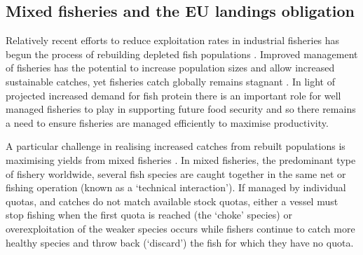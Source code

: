 \documentclass{nature}
\begin{document}
\begin{linenumbers}
\begin{abstract}
[296 words]

\end{abstract}

\section*{}

\subsection{Mixed fisheries and the EU landings obligation} 

Relatively recent efforts to reduce exploitation rates in industrial fisheries has begun the process of 
rebuilding depleted fish populations \cite{Worm2009}.
Improved management of fisheries has the potential to increase population sizes
and allow increased sustainable catches, yet fisheries catch globally remains stagnant
\cite{FAO2016}. In light of projected increased demand for fish protein
\cite{B??n??2016} there is an important role for well managed fisheries to play
in supporting future food security \cite{Mcclanahan2015} and so there remains a
need to ensure fisheries are managed efficiently to maximise productivity.

A particular challenge in realising increased catches from rebuilt populations
is maximising yields from mixed fisheries \cite{Branch2008, Kuriyama2016,
	Ulrich2016}. In mixed fisheries, the predominant type
of fishery worldwide, several fish species are caught together in the same net
or fishing operation (known as a `technical interaction'). If managed by
individual quotas, and catches do not match available stock quotas, either a
vessel must stop fishing when the first quota is reached (the `choke' species)
or overexploitation of the weaker species occurs while fishers continue to
catch more healthy species and throw back (`discard') the fish for which they
have no quota.


\end{linenumbers}
\end{document}

